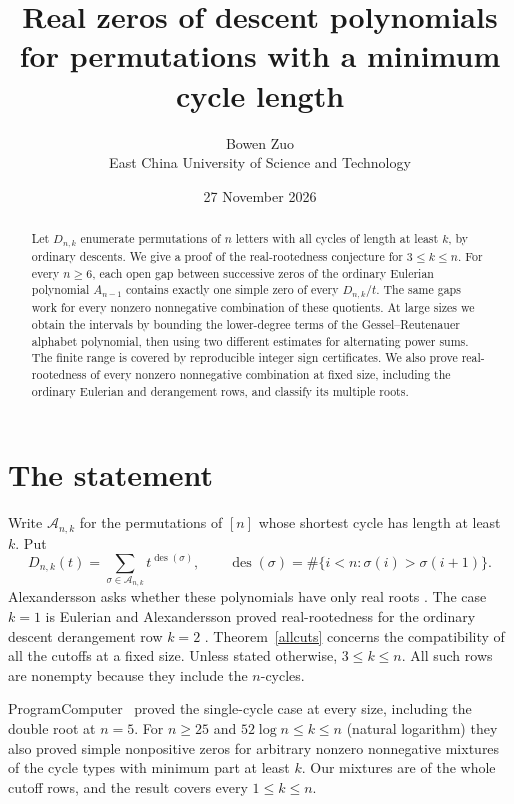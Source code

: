 \documentclass[11pt]{article}
\title{Real zeros of descent polynomials for permutations with a minimum cycle length}
\author{Bowen Zuo\\ {\small East China University of Science and Technology}}
\date{27 November 2026}
\DeclareMathOperator{\des}{des}
\begin{document}
\maketitle
\begin{abstract}
Let $D_{n,k}$ enumerate permutations of $n$ letters with all cycles of length at least $k$, by ordinary descents. We give a proof of the real-rootedness conjecture for $3\le k\le n$. For every $n\ge6$, each open gap between successive zeros of the ordinary Eulerian polynomial $A_{n-1}$ contains exactly one simple zero of every $D_{n,k}/t$. The same gaps work for every nonzero nonnegative combination of these quotients. At large sizes we obtain the intervals by bounding the lower-degree terms of the Gessel--Reutenauer alphabet polynomial, then using two different estimates for alternating power sums. The finite range is covered by reproducible integer sign certificates. We also prove real-rootedness of every nonzero nonnegative combination at fixed size, including the ordinary Eulerian and derangement rows, and classify its multiple roots.
\end{abstract}

\section{The statement}
Write $\mathcal A_{n,k}$ for the permutations of $[n]$ whose shortest cycle has length at least $k$. Put
\[
 D_{n,k}(t)=\sum_{\sigma\in\mathcal A_{n,k}}t^{\des(\sigma)},\qquad
 \des(\sigma)=\#\{i<n:\sigma(i)>\sigma(i+1)\}.
\]
Alexandersson asks whether these polynomials have only real roots \cite{open}. The case $k=1$ is Eulerian and Alexandersson proved real-rootedness for the ordinary descent derangement row $k=2$ \cite[Theorem~2.1]{der}. Theorem~\ref{allcuts} concerns the compatibility of all the cutoffs at a fixed size. Unless stated otherwise, $3\le k\le n$. All such rows are nonempty because they include the $n$-cycles.

ProgramComputer~\cite{pc} proved the single-cycle case at every size,
including the double root at $n=5$. For $n\ge25$ and $52\log n\le k\le n$ (natural logarithm)
they also proved simple nonpositive zeros for arbitrary nonzero
nonnegative mixtures of the cycle types with minimum part at least $k$.
Our mixtures are of the whole cutoff rows, and the result covers every
$1\le k\le n$.
\end{document}
